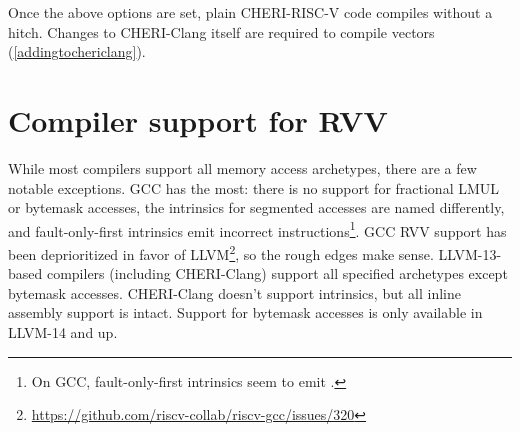 Once the above options are set, plain CHERI-RISC-V code compiles without a hitch.
Changes to CHERI-Clang itself are required to compile vectors (\cref{addingtochericlang}).

\section{Compiler support for RVV}\label{compilerdifferences}
While most compilers support all memory access archetypes, there are a few notable exceptions.
GCC has the most: there is no support for fractional LMUL or bytemask accesses, the intrinsics for segmented accesses are named differently, and fault-only-first intrinsics emit incorrect instructions\footnote{On GCC, fault-only-first intrinsics seem to emit .}.
GCC RVV support has been deprioritized in favor of LLVM\footnote{\url{https://github.com/riscv-collab/riscv-gcc/issues/320}}, so the rough edges make sense.
LLVM-13-based compilers (including CHERI-Clang) support all specified archetypes except bytemask accesses.
CHERI-Clang doesn't support intrinsics, but all inline assembly support is intact.
Support for bytemask accesses is only available in LLVM-14 and up.